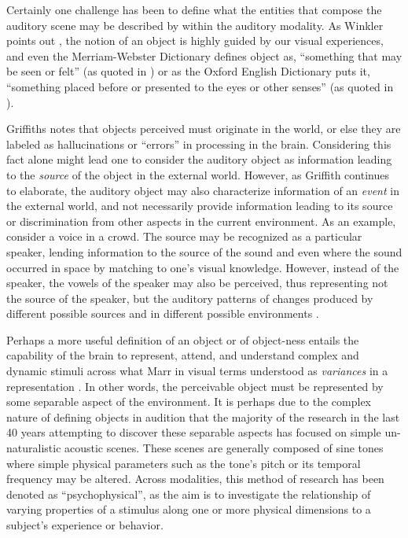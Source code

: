 \documentclass[a4paper,10pt,final]{ThesisStyle}
\begin{document}
Certainly one challenge has been to define what the entities that compose the auditory scene may be described by within the auditory modality.  As Winkler points out \cite{Ist2010}, the notion of an object is highly guided by our visual experiences, and even the Merriam-Webster Dictionary defines object as, ``something that may be seen or felt'' (as quoted in \cite{Ist2010}) or as the Oxford English Dictionary puts it, ``something placed before or presented to the eyes or other senses'' (as quoted in \cite{Griffiths2004}).  

Griffiths notes that objects perceived must originate in the world, or else they are labeled as hallucinations or ``errors'' in processing in the brain.  Considering this fact alone might lead one to consider the auditory object as information leading to the \textit{source} of the object in the external world.  However, as Griffith continues to elaborate, the auditory object may also characterize information of an \textit{event} in the external world, and not necessarily provide information leading to its source or discrimination from other aspects in the current environment.  As an example, consider a voice in a crowd.  The source may be recognized as a particular speaker, lending information to the source of the sound and even where the sound occurred in space by matching to one's visual knowledge.  However, instead of the speaker, the vowels of the speaker may also be perceived, thus representing not the source of the speaker, but the auditory patterns of changes produced by different possible sources and in different possible environments \cite{Griffiths2004}.  

Perhaps a more useful definition of an object or of object-ness entails the capability of the brain to represent, attend, and understand complex and dynamic stimuli across what Marr in visual terms understood as \textit{variances} in a representation \cite{Marr1982}.  In other words, the perceivable object must be represented by some separable aspect of the environment.   It is perhaps due to the complex nature of defining objects in audition that the majority of the research in the last 40 years attempting to discover these separable aspects has focused on simple un-naturalistic acoustic scenes.  These scenes are generally composed of sine tones where simple physical parameters such as the tone's pitch or its temporal frequency may be altered.  Across modalities, this method of research has been denoted as ``psychophysical'', as the aim is to investigate the relationship of varying properties of a stimulus along one or more physical dimensions to a subject's experience or behavior. 
\end{document}
